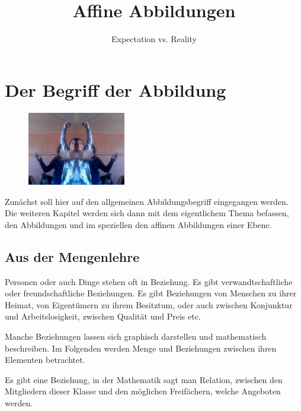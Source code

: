 \documentclass[%
11pt,%
twoside,%
titlepage,%
german,%
headsepline%
]{scrartcl}
\title{Affine Abbildungen}
\subtitle{Expectation vs. Reality}
\author{}
\date{}
\begin{document}
\maketitle
\tableofcontents
\cleardoublepage

\section{Der Begriff der Abbildung}

\begin{figure}
\vspace{-15pt}
  \begin{center}
    \includegraphics[width=0.382\textwidth]{miriam}
  \end{center}
\vspace{-22pt}
\end{figure}
Zunächst soll hier auf den allgemeinen Abbildungsbegriff eingegangen werden. Die weiteren Kapitel werden sich dann mit dem eigentlichem Thema befassen, den Abbildungen und im speziellen den affinen Abbildungen einer Ebene.

\subsection{Aus der Mengenlehre}
Personen oder auch Dinge stehen oft in Beziehung. Es gibt verwandtschaftliche oder freundschaftliche Beziehungen. Es gibt Beziehungen von Menschen zu ihrer Heimat, von Eigentümern zu ihrem Besitztum, oder auch zwischen Konjunktur und Arbeitslosigkeit, zwischen Qualität und Preis etc.

Manche Beziehungen lassen sich graphisch darstellen und mathematisch beschreiben. Im Folgenden werden Menge und Beziehungen zwischen ihren Elementen betrachtet.

\begin{bsp}
Es gibt eine Beziehung, in der Mathematik sagt man Relation, zwischen den Mitgliedern dieser Klasse und den möglichen Freifächern, welche Angeboten werden.
\end{bsp}
\end{document}
